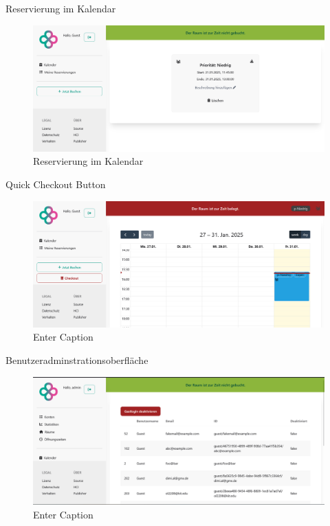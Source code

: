 \documentclass{sdqbeamer}
\begin{document}
\begin{frame}{Reservierung im Kalendar}
    \begin{figure}
        \centering
        \includegraphics[width=1\linewidth]{bookings_single.png}
        \caption{Reservierung im Kalendar}
        \label{fig:enter-label}
    \end{figure}
\end{frame}

\begin{frame}{Quick Checkout Button}
    \begin{figure}
        \centering
        \includegraphics[width=1\linewidth]{check_out_button_light.png}
        \caption{Enter Caption}
        \label{fig:enter-label}
    \end{figure}
\end{frame}

\begin{frame}{Benutzeradminstrationsoberfläche}
    \begin{figure}
        \centering
        \includegraphics[width=1\linewidth]{admin_users.png}
        \caption{Enter Caption}
        \label{fig:enter-label}
    \end{figure}
    
\end{frame}
\end{document}
